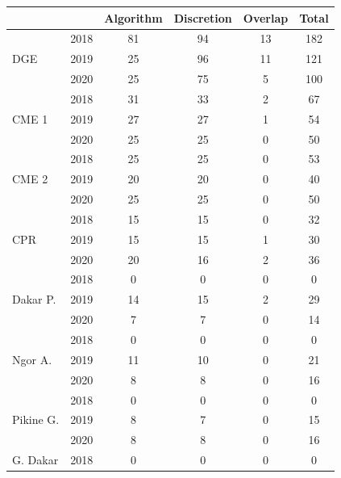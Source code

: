 \begin{tabular}{llcccc}
            & & Algorithm&  Discretion&     Overlap&       Total\\
\hline
\multirow{3}{*}{DGE} & 2018&          81&          94&          13&         182\\
& 2019      &          25&          96&          11&         121\\
& 2020      &          25&          75&           5&         100\\
\hline \multirow{3}{*}{CME 1} & 2018&          31&          33&           2&          67\\
& 2019      &          27&          27&           1&          54\\
& 2020      &          25&          25&           0&          50\\
\hline \multirow{3}{*}{CME 2} & 2018&          25&          25&           0&          53\\
& 2019      &          20&          20&           0&          40\\
& 2020      &          25&          25&           0&          50\\
\hline \multirow{3}{*}{CPR} & 2018&          15&          15&           0&          32\\
& 2019      &          15&          15&           1&          30\\
& 2020      &          20&          16&           2&          36\\
\hline \multirow{3}{*}{Dakar P.} & 2018&           0&           0&           0&           0\\
& 2019      &          14&          15&           2&          29\\
& 2020      &           7&           7&           0&          14\\
\hline \multirow{3}{*}{Ngor A.} & 2018&           0&           0&           0&           0\\
& 2019      &          11&          10&           0&          21\\
& 2020      &           8&           8&           0&          16\\
\hline \multirow{3}{*}{Pikine G.} & 2018&           0&           0&           0&           0\\
& 2019      &           8&           7&           0&          15\\
& 2020      &           8&           8&           0&          16\\
\hline \multirow{3}{*}{G. Dakar} & 2018&           0&           0&           0&           0\\

\end{tabular}
